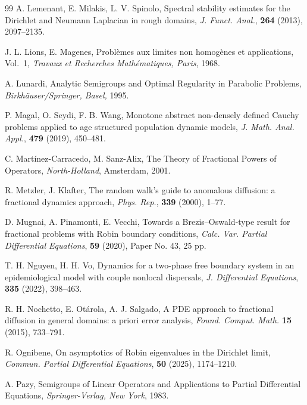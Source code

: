 \documentclass[a4paper,11pt]{amsart}
\theoremstyle{definition}
\numberwithin{equation}{section}
\theoremstyle{definition}
\begin{document}
\begin{thebibliography}{99}
A. Lemenant, E. Milakis, L. V. Spinolo, 
Spectral stability estimates for the Dirichlet and Neumann Laplacian in rough domains, 
\textit{J. Funct. Anal.}, \textbf{264} (2013), 2097--2135.

J. L. Lions, E. Magenes, 
Problèmes aux limites non homogènes et applications, Vol.~1, 
\textit{Travaux et Recherches Mathématiques, Paris}, 1968.

A. Lunardi, 
Analytic Semigroups and Optimal Regularity in Parabolic Problems, 
\textit{Birkhäuser/Springer, Basel,} 1995.

P. Magal, O. Seydi, F. B. Wang, 
Monotone abstract non-densely defined Cauchy problems applied to age structured population dynamic models, 
\textit{J. Math. Anal. Appl.}, \textbf{479} (2019), 450--481.

C. Martínez-Carracedo, M. Sanz-Alix, 
The Theory of Fractional Powers of Operators, 
\textit{North-Holland}, Amsterdam, 2001.

R. Metzler, J. Klafter, 
The random walk's guide to anomalous diffusion: a fractional dynamics approach, 
\textit{Phys. Rep.}, \textbf{339} (2000), 1--77.

D. Mugnai, A. Pinamonti, E. Vecchi, 
Towards a Brezis–Oswald-type result for fractional problems with Robin boundary conditions, 
\textit{Calc. Var. Partial Differential Equations}, \textbf{59} (2020), Paper No. 43, 25 pp. 



T. H. Nguyen, H. H. Vo, 
Dynamics for a two-phase free boundary system in an epidemiological model with couple nonlocal dispersals, 
\textit{J. Differential Equations}, \textbf{335} (2022), 398--463.

R. H. Nochetto, E. Otárola, A. J. Salgado, 
A PDE approach to fractional diffusion in general domains: a priori error analysis, 
\textit{Found. Comput. Math.} \textbf{15} (2015), 733--791.


R. Ognibene, 
On asymptotics of Robin eigenvalues in the Dirichlet limit, 
\textit{Commun. Partial Differential Equations}, \textbf{50} (2025), 1174--1210. 



A. Pazy, 
Semigroups of Linear Operators and Applications to Partial Differential Equations, \textit{Springer-Verlag, New York}, 1983.



\end{thebibliography}
\end{document}

